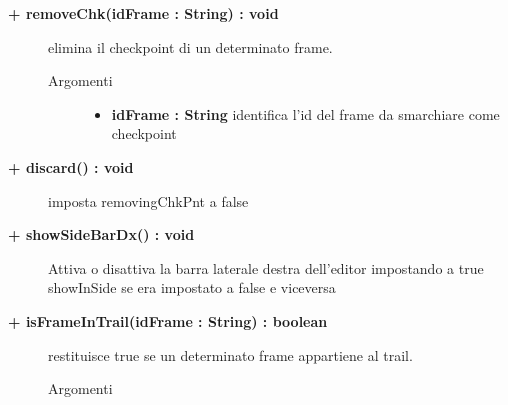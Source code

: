 \begin{description}
\begin{description}
\begin{description}
\begin{itemize}
				\end{itemize}
		\end{description}
	\end{description}
	
	\begin{description}
		\item[\textbf{\color{blue}+ removeChk(idFrame : String) : void			}] \hfill
			elimina il checkpoint di un determinato frame.
			
		\begin{description}
			\item[Argomenti] \hfill
				\begin{itemize}
				
					\item \textbf{idFrame : String			} \hfill
						identifica l'id del frame da smarchiare come checkpoint
					
				\end{itemize}
		\end{description}
	\end{description}
	
	\begin{description}
		\item[\textbf{\color{blue}+ discard() : void			}] \hfill
			imposta removingChkPnt a false
	\end{description}
	
	\begin{description}
		\item[\textbf{\color{blue}+ showSideBarDx() : void			}] \hfill
			Attiva o disattiva la barra laterale destra dell’editor impostando a true
showInSide se era impostato a false e viceversa
			
	\end{description}
	
	\begin{description}
		\item[\textbf{\color{blue}+ isFrameInTrail(idFrame : String) : boolean			}] \hfill
			restituisce true se un determinato frame appartiene al trail.
			
		\begin{description}
			\item[Argomenti] \hfill
				\begin{itemize}
				

\end{itemize}
\end{description}
\end{description}
\end{description}
